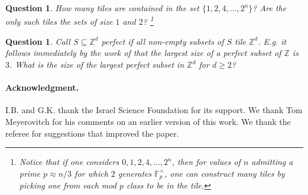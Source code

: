 \documentclass{article}
\newcommand{\Z}{\mathbb{Z}}
\newtheorem{question}[theorem]{Question}
\begin{document}
\begin{question}
    How many tiles are contained in the set \(\{1,2,4,\ldots,2^n\}\)? Are the only such tiles the sets of size \(1\) and \(2\)? \footnote{Notice that if one considers \(0,1,2,4,\ldots,2^n\), then for values of \(n\) admitting a prime \(p\approx n/3\) for which \(2\) generates \(\mathbb F_p^\times\), one can construct many tiles by picking one from each mod \(p\) class to be in the tile.}
\end{question}

\begin{question}
    Call $S \subseteq \Z^d$ \emph{perfect} if all non-empty subsets of $S$ tile $\Z^d$. E.g. it follows immediately by the work of \cite{Newman} that the largest size of a perfect subset of \(\Z\) is \(3\). What is the size of the largest perfect subset in $\Z^d$ for $d \geq 2$?
\end{question}


\paragraph{Acknowledgment.} I.B. and G.K. thank the Israel Science Foundation for its support. We thank Tom Meyerovitch for his comments on an earlier version of this work. We thank the referee for suggestions that improved the paper.



\end{document}
